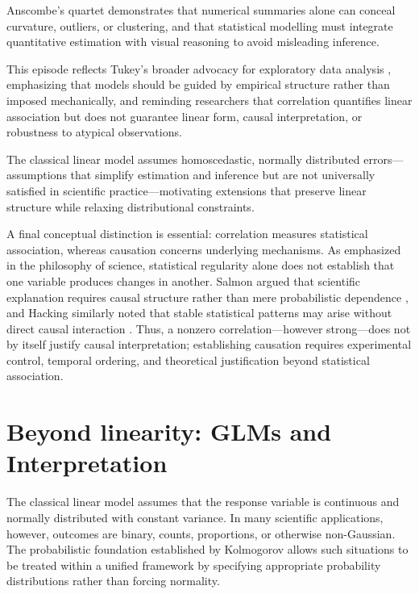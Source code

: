 \medskip

Anscombe’s quartet demonstrates that numerical summaries alone can conceal curvature, outliers, or clustering, and that statistical modelling must integrate quantitative estimation with visual reasoning to avoid misleading inference.

\medskip

This episode reflects Tukey’s broader advocacy for exploratory data analysis \cite{tukey_1977_eda}, emphasizing that models should be guided by empirical structure rather than imposed mechanically, and reminding researchers that correlation quantifies linear association but does not guarantee linear form, causal interpretation, or robustness to atypical observations.

\medskip

The classical linear model assumes homoscedastic, normally distributed errors—assumptions that simplify estimation and inference but are not universally satisfied in scientific practice—motivating extensions that preserve linear structure while relaxing distributional constraints.

\medskip

A final conceptual distinction is essential: correlation measures statistical association, whereas causation concerns underlying mechanisms. As emphasized in the philosophy of science, statistical regularity alone does not establish that one variable produces changes in another. Salmon argued that scientific explanation requires causal structure rather than mere probabilistic dependence \cite{salmon_1984_scientific}, and Hacking similarly noted that stable statistical patterns may arise without direct causal interaction \cite{hacking_1975_emergence}. Thus, a nonzero correlation—however strong—does not by itself justify causal interpretation; establishing causation requires experimental control, temporal ordering, and theoretical justification beyond statistical association.

\section{Beyond linearity: GLMs and Interpretation}

The classical linear model assumes that the response variable is continuous and normally distributed with constant variance. In many scientific applications, however, outcomes are binary, counts, proportions, or otherwise non-Gaussian. The probabilistic foundation established by Kolmogorov \cite{kolmogorov_1933_grundbegriffe} allows such situations to be treated within a unified framework by specifying appropriate probability distributions rather than forcing normality.

